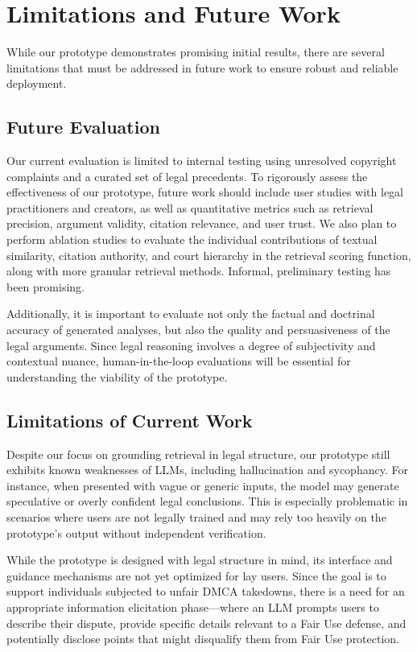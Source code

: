 \section{Limitations and Future Work}

While our prototype demonstrates promising initial results, there are several limitations that must be addressed in future work to ensure robust and reliable deployment.

\subsection{Future Evaluation}

Our current evaluation is limited to internal testing using unresolved copyright complaints and a curated set of legal precedents. To rigorously assess the effectiveness of our prototype, future work should include user studies with legal practitioners and creators, as well as quantitative metrics such as retrieval precision, argument validity, citation relevance, and user trust. We also plan to perform ablation studies to evaluate the individual contributions of textual similarity, citation authority, and court hierarchy in the retrieval scoring function, along with more granular retrieval methods. Informal, preliminary testing has been promising.

Additionally, it is important to evaluate not only the factual and doctrinal accuracy of generated analyses, but also the quality and persuasiveness of the legal arguments. Since legal reasoning involves a degree of subjectivity and contextual nuance, human-in-the-loop evaluations will be essential for understanding the viability of the prototype.

\subsection{Limitations of Current Work}

Despite our focus on grounding retrieval in legal structure, our prototype still exhibits known weaknesses of LLMs, including hallucination and sycophancy. For instance, when presented with vague or generic inputs, the model may generate speculative or overly confident legal conclusions. This is especially problematic in scenarios where users are not legally trained and may rely too heavily on the prototype’s output without independent verification.

While the prototype is designed with legal structure in mind, its interface and guidance mechanisms are not yet optimized for lay users. Since the goal is to support individuals subjected to unfair DMCA takedowns, there is a need for an appropriate information elicitation phase—where an LLM prompts users to describe their dispute, provide specific details relevant to a Fair Use defense, and potentially disclose points that might disqualify them from Fair Use protection.

